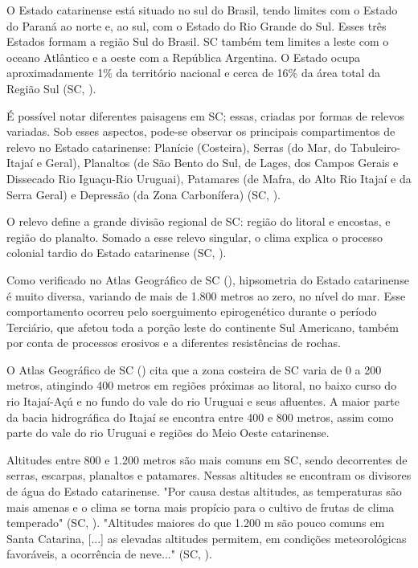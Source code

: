 \indent O Estado catarinense está situado no sul do Brasil, tendo limites com o Estado do Paraná ao norte e, ao sul, com o Estado do Rio Grande do Sul. Esses três Estados  formam a região Sul do Brasil. \acrlong{SC} também tem limites a leste com o oceano Atlântico e a oeste com a República Argentina.  O Estado ocupa aproximadamente 1\% da território nacional e  cerca de 16\% da área total da Região Sul (\acrlong{SC}, \citeyear{AtlasSCterritorio}).

\indent É possível notar diferentes paisagens em \acrlong{SC}; essas, criadas por formas de relevos variadas. Sob esses aspectos, pode-se observar os principais compartimentos de relevo no Estado catarinense: Planície (Costeira), Serras (do Mar, do Tabuleiro-Itajaí e Geral), Planaltos (de São Bento do Sul, de Lages, dos Campos Gerais e Dissecado Rio Iguaçu-Rio Uruguai), Patamares (de Mafra, do Alto Rio Itajaí e da Serra Geral) e Depressão (da Zona Carbonífera) (\acrlong{SC}, \citeyear{AtlasSCnatureza}).

\indent O relevo define a grande divisão regional de \acrlong{SC}: região do
litoral e encostas, e região do planalto. Somado a esse relevo singular, o clima explica o processo colonial tardio do Estado catarinense (\acrlong{SC}, \citeyear{AtlasSCpopulacao}).

\indent Como verificado no Atlas Geográfico de \acrlong{SC} (\citeyear{AtlasSCnatureza}), hipsometria do Estado catarinense é muito diversa, variando de mais de 1.800 metros ao zero, no nível do mar. Esse comportamento ocorreu pelo soerguimento epirogenético durante o período Terciário, que afetou toda a porção leste do continente Sul Americano, também por conta de processos erosivos e a diferentes resistências de rochas.

\indent O  Atlas Geográfico de \acrlong{SC} (\citeyear{AtlasSCnatureza}) cita que a zona costeira de \acrlong{SC} varia de 0 a 200 metros, atingindo 400 metros em regiões próximas ao litoral, no baixo curso do rio Itajaí-Açú e no fundo do vale do rio Uruguai e seus afluentes. A maior parte da bacia hidrográfica do Itajaí se encontra entre 400 e 800 metros, assim como parte do vale do rio Uruguai e regiões do Meio Oeste catarinense.

\indent Altitudes entre 800 e 1.200 metros são mais comuns em \acrlong{SC}, sendo decorrentes de serras, escarpas, planaltos e patamares. Nessas altitudes se encontram os divisores de água do Estado catarinense. "Por causa destas altitudes, as temperaturas são mais amenas e o clima se torna mais propício para o cultivo de frutas de clima temperado" (\acrlong{SC}, \citeyear{AtlasSCnatureza}). "Altitudes maiores do que 1.200 m são pouco comuns em Santa Catarina, [...] as elevadas altitudes permitem, em condições meteorológicas favoráveis, a ocorrência de neve..." (\acrlong{SC}, \citeyear{AtlasSCnatureza}).

